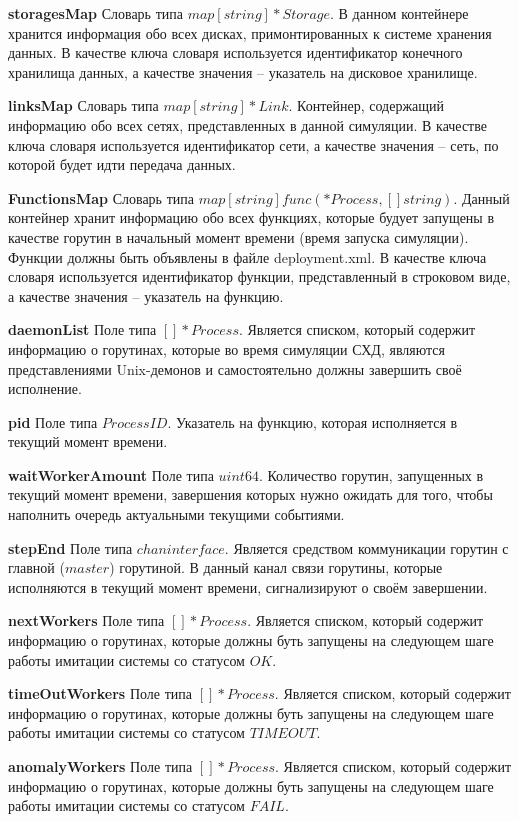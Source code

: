 \begin{itemize}
\textbf{storagesMap}   
Словарь типа $map[string]*Storage$. В данном контейнере хранится информация обо всех дисках, примонтированных к системе хранения данных. В качестве ключа словаря используется идентификатор конечного хранилища данных, а качестве значения -- указатель на дисковое хранилище.

\textbf{linksMap}      
Словарь типа $map[string]*Link$. Контейнер, содержащий информацию обо всех сетях, представленных в данной симуляции.  В качестве ключа словаря используется идентификатор сети, а качестве значения -- сеть, по которой будет идти передача данных.

\textbf{FunctionsMap} 
Словарь типа $map[string]func(*Process, []string)$. Данный контейнер хранит информацию обо всех функциях, которые будует запущены в качестве горутин в начальный момент времени (время запуска симуляции). Функции должны быть объявлены в файле deployment.xml.  В качестве ключа словаря используется идентификатор функции, представленный в строковом виде, а качестве значения -- указатель на функцию.

\textbf{daemonList}  
Поле типа $[]*Process$. Является списком, который содержит информацию о горутинах, которые во время симуляции СХД, являются представлениями Unix-демонов и самостоятельно должны завершить своё исполнение.

\textbf{pid} 
Поле типа $ProcessID$. Указатель на функцию, которая исполняется в текущий момент времени.

\textbf{waitWorkerAmount} 
Поле типа $uint64$. Количество горутин, запущенных в текущий момент времени, завершения которых нужно ожидать для того, чтобы наполнить очередь актуальными текущими событиями. 

\textbf{stepEnd}        
Поле типа $chan interface{}$. Является средством коммуникации горутин с главной ($master$) горутиной. В данный канал связи горутины, которые исполняются в текущий момент времени, сигнализируют о своём завершении.

\textbf{nextWorkers}
Поле типа $[]*Process$. Является списком, который содержит информацию о горутинах, которые должны буть запущены на следующем шаге работы имитации системы со статусом $OK$.

\textbf{timeOutWorkers}   
Поле типа $[]*Process$. Является списком, который содержит информацию о горутинах, которые должны буть запущены на следующем шаге работы имитации системы со статусом $TIMEOUT$.

\textbf{anomalyWorkers}   
Поле типа $[]*Process$. Является списком, который содержит информацию о горутинах, которые должны буть запущены на следующем шаге работы имитации системы со статусом $FAIL$.


\end{itemize}
